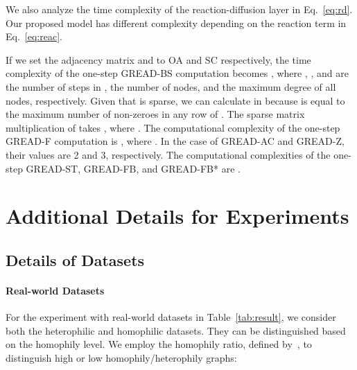 \documentclass{article}
\theoremstyle{plain}
\theoremstyle{definition}
\theoremstyle{remark}
\begin{document}
We also analyze the time complexity of the reaction-diffusion layer in Eq.~\eqref{eq:rd}. Our proposed model has different complexity depending on the reaction term  in Eq.~\eqref{eq:reac}.

If we set the adjacency matrix and  to OA and SC respectively, the time complexity of the one-step GREAD-BS computation becomes , where , , and  are the number of steps in , the number of nodes, and the maximum degree of all nodes, respectively. Given that  is sparse, we can calculate  in  because  is equal to the maximum number of non-zeroes in any row of . The sparse matrix multiplication of  takes , where .
The computational complexity of the one-step GREAD-F computation is , where . In the case of GREAD-AC and GREAD-Z, their  values are 2 and 3, respectively. The computational complexities of the one-step GREAD-ST, GREAD-FB, and GREAD-FB* are . 


\section{Additional Details for Experiments}\label{a:details}
\subsection{Details of Datasets}

\paragraph{Real-world Datasets}
For the experiment with real-world datasets in Table~\ref{tab:result}, we consider both the heterophilic and homophilic datasets. They can be distinguished based on the homophily level. We employ the homophily ratio, defined by~\cite{pei2020geomGCN}, to distinguish high or low homophily/heterophily graphs:
\end{document}
